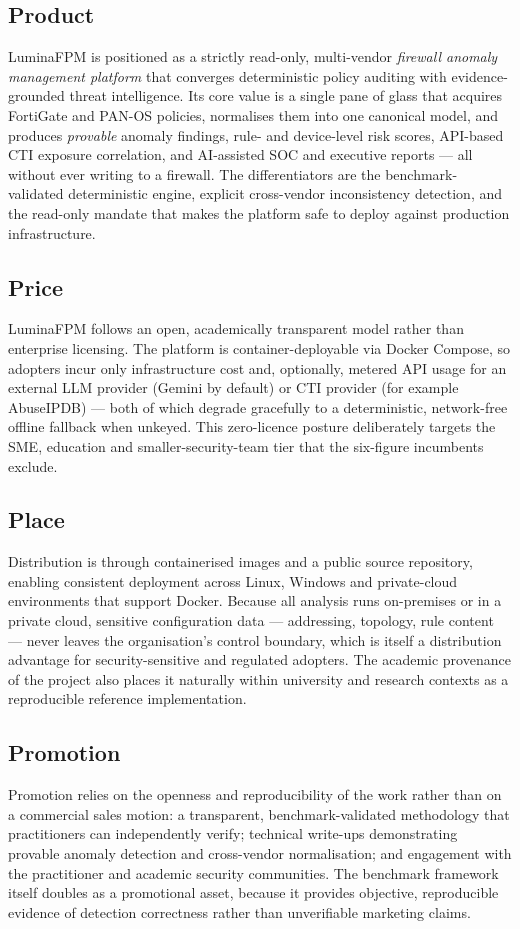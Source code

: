 \documentclass[12pt,a4paper]{report}
\renewcommand{\_}{\textunderscore\allowbreak}
\begin{document}
\subsection{Product}
LuminaFPM is positioned as a strictly read-only, multi-vendor \emph{firewall anomaly management platform} that converges deterministic policy auditing with evidence-grounded threat intelligence. Its core value is a single pane of glass that acquires FortiGate and PAN-OS policies, normalises them into one canonical model, and produces \emph{provable} anomaly findings, rule- and device-level risk scores, API-based CTI exposure correlation, and AI-assisted SOC and executive reports --- all without ever writing to a firewall. The differentiators are the benchmark-validated deterministic engine, explicit cross-vendor inconsistency detection, and the read-only mandate that makes the platform safe to deploy against production infrastructure.

\subsection{Price}
LuminaFPM follows an open, academically transparent model rather than enterprise licensing. The platform is container-deployable via Docker Compose, so adopters incur only infrastructure cost and, optionally, metered API usage for an external LLM provider (Gemini by default) or CTI provider (for example AbuseIPDB) --- both of which degrade gracefully to a deterministic, network-free offline fallback when unkeyed. This zero-licence posture deliberately targets the SME, education and smaller-security-team tier that the six-figure incumbents exclude.

\subsection{Place}
Distribution is through containerised images and a public source repository, enabling consistent deployment across Linux, Windows and private-cloud environments that support Docker. Because all analysis runs on-premises or in a private cloud, sensitive configuration data --- addressing, topology, rule content --- never leaves the organisation's control boundary, which is itself a distribution advantage for security-sensitive and regulated adopters. The academic provenance of the project also places it naturally within university and research contexts as a reproducible reference implementation.

\subsection{Promotion}
Promotion relies on the openness and reproducibility of the work rather than on a commercial sales motion: a transparent, benchmark-validated methodology that practitioners can independently verify; technical write-ups demonstrating provable anomaly detection and cross-vendor normalisation; and engagement with the practitioner and academic security communities. The benchmark framework itself doubles as a promotional asset, because it provides objective, reproducible evidence of detection correctness rather than unverifiable marketing claims.
\end{document}

